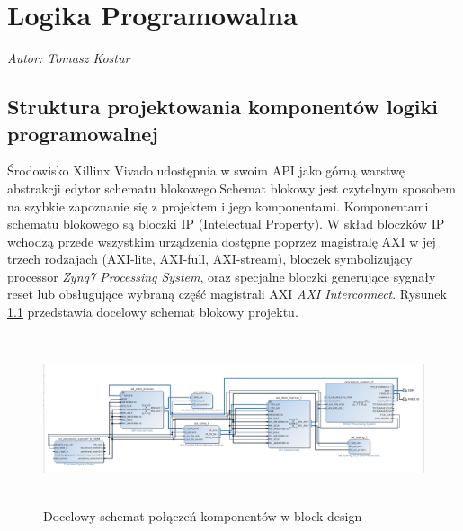 \lstset{language=Verilog,
    numbers=left,
    frame=single,
    breaklines=true,
    captionpos=t,
    numberfirstline=false}

\chapter{Logika Programowalna}
\label{sec:logika}
\textit{Autor: Tomasz Kostur}

\section{Struktura projektowania komponentów logiki programowalnej}
\label{sec:logika:struktura}

Środowisko Xillinx Vivado udostępnia w swoim API jako górną warstwę abstrakcji
edytor schematu blokowego.Schemat blokowy jest czytelnym sposobem na szybkie
zapoznanie się z projektem i jego komponentami.
Komponentami schematu blokowego są bloczki IP (Intelectual Property).
W skład bloczków IP wchodzą przede wszystkim urządzenia dostępne poprzez magistralę
AXI w jej trzech rodzajach (AXI-lite, AXI-full, AXI-stream), bloczek symbolizujący processor
\textit{Zynq7 Processing System}, oraz specjalne bloczki generujące sygnały reset
lub obsługujące wybraną część magistrali AXI \textit{AXI Interconnect}.
Rysunek \ref{fig:block} przedstawia docelowy schemat blokowy projektu.

\begin{figure}[h]
    \begin{center}

    \includegraphics[height = 5cm]{figures/axi_matching_block_design.png}
    \caption["Wypłaszczanie macierzy"]{Docelowy schemat połączeń komponentów w block design}
    \label{fig:block}

    \end{center}
\end{figure}




